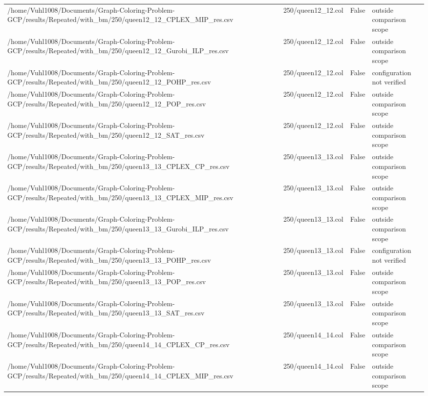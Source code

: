 \begin{table}[htbp]
\begin{tabular}{llll}
/home/Vuhl1008/Documents/Graph-Coloring-Problem-GCP/results/Repeated/with\_bm/250/queen12\_12\_CPLEX\_MIP\_res.csv & 250/queen12\_12.col & False & outside comparison scope \\
/home/Vuhl1008/Documents/Graph-Coloring-Problem-GCP/results/Repeated/with\_bm/250/queen12\_12\_Gurobi\_ILP\_res.csv & 250/queen12\_12.col & False & outside comparison scope \\
/home/Vuhl1008/Documents/Graph-Coloring-Problem-GCP/results/Repeated/with\_bm/250/queen12\_12\_POHP\_res.csv & 250/queen12\_12.col & False & configuration not verified \\
/home/Vuhl1008/Documents/Graph-Coloring-Problem-GCP/results/Repeated/with\_bm/250/queen12\_12\_POP\_res.csv & 250/queen12\_12.col & False & outside comparison scope \\
/home/Vuhl1008/Documents/Graph-Coloring-Problem-GCP/results/Repeated/with\_bm/250/queen12\_12\_SAT\_res.csv & 250/queen12\_12.col & False & outside comparison scope \\
/home/Vuhl1008/Documents/Graph-Coloring-Problem-GCP/results/Repeated/with\_bm/250/queen13\_13\_CPLEX\_CP\_res.csv & 250/queen13\_13.col & False & outside comparison scope \\
/home/Vuhl1008/Documents/Graph-Coloring-Problem-GCP/results/Repeated/with\_bm/250/queen13\_13\_CPLEX\_MIP\_res.csv & 250/queen13\_13.col & False & outside comparison scope \\
/home/Vuhl1008/Documents/Graph-Coloring-Problem-GCP/results/Repeated/with\_bm/250/queen13\_13\_Gurobi\_ILP\_res.csv & 250/queen13\_13.col & False & outside comparison scope \\
/home/Vuhl1008/Documents/Graph-Coloring-Problem-GCP/results/Repeated/with\_bm/250/queen13\_13\_POHP\_res.csv & 250/queen13\_13.col & False & configuration not verified \\
/home/Vuhl1008/Documents/Graph-Coloring-Problem-GCP/results/Repeated/with\_bm/250/queen13\_13\_POP\_res.csv & 250/queen13\_13.col & False & outside comparison scope \\
/home/Vuhl1008/Documents/Graph-Coloring-Problem-GCP/results/Repeated/with\_bm/250/queen13\_13\_SAT\_res.csv & 250/queen13\_13.col & False & outside comparison scope \\
/home/Vuhl1008/Documents/Graph-Coloring-Problem-GCP/results/Repeated/with\_bm/250/queen14\_14\_CPLEX\_CP\_res.csv & 250/queen14\_14.col & False & outside comparison scope \\
/home/Vuhl1008/Documents/Graph-Coloring-Problem-GCP/results/Repeated/with\_bm/250/queen14\_14\_CPLEX\_MIP\_res.csv & 250/queen14\_14.col & False & outside comparison scope \\

\end{tabular}
\end{table}
